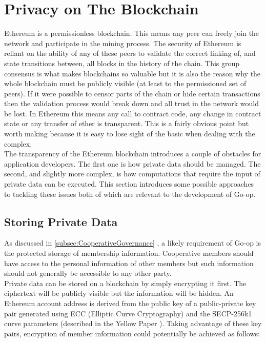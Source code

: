 \section{Privacy on The Blockchain}
\label{sec:blockchainprivacy}
Ethereum is a permissionless blockchain. This means any peer can freely join the network and participate in the mining process. The security of Ethereum is reliant on the ability of any of these peers to validate the correct linking of, and state transitions between, all blocks in the history of the chain. This group consensus is what makes blockchains so valuable but it is also the reason why the whole blockchain must be publicly visible (at least to the permissioned set of peers). If it were possible to censor parts of the chain or hide certain transactions then the validation process would break down and all trust in the network would be lost. In Ethereum this means any call to contract code, any change in contract state or any transfer of ether is transparent. This is a fairly obvious point but worth making because it is easy to lose sight of the basic when dealing with the complex.\\

The transparency of the Ethereum blockchain introduces a couple of obstacles for application developers. The first one is how private data should be managed. The second, and slightly more complex, is how computations that require the input of private data can be executed. This section introduces some possible approaches to tackling these issues both of which are relevant to the development of Go-op. \\

\subsection{Storing Private Data}
As discussed in \ref{subsec:CooperativeGovernance} , a likely requirement of Go-op is the protected storage of membership information. Cooperative members should have access to the personal information of other members but such information should not generally be accessible to any other party. \\

Private data can be stored on a blockchain by simply encrypting it first. The ciphertext will be publicly visible but the information will be hidden. An Ethereum account address is derived from the public key of a public-private key pair generated using ECC (Elliptic Curve Cryptography) and the SECP-256k1 curve parameters (described in the Yellow Paper \cite{Yellowpaper}). Taking advantage of these key pairs, encryption of member information could potentially be achieved as follows:\\

